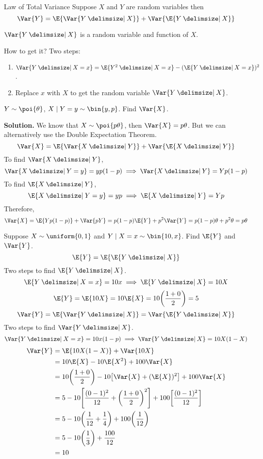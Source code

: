 \begin{Theorem}{Law of Total Variance}{}
    Suppose $ X $ and $ Y $ are random variables then
    \[ \Var{Y}=\E{\Var{Y\given X}}+\Var{\E{Y\given X}} \]
\end{Theorem}
\begin{Remark}{}{}
    $ \Var{Y\given X} $ is a random variable and function of $ X $.

    How to get it? Two steps:
    \begin{enumerate}
        \item $ \Var{Y\given X=x}=\E{Y^2\given X=x}-(\E{Y\given X=x})^2 $.
        \item Replace $ x $ with $ X $ to get
              the random variable $ \Var{Y\given X} $.
    \end{enumerate}
\end{Remark}
\begin{Example}{}{}
    $ Y \sim \poi{\theta} $, $ X\mid Y=y \sim \bin{y,p} $. Find
    $ \Var{X} $.

    \textbf{Solution.} We know that $ X \sim \poi{p\theta} $,
    then $ \Var{X}=p\theta $. But we can alternatively
    use the Double Expectation Theorem.
    \[ \Var{X}=\E{\Var{X\given Y}}+\Var{\E{X\given Y}} \]
    To find $ \Var{X\given Y} $,
    \[ \Var{X\given Y=y}=yp(1-p)\implies \Var{X\given Y}=Yp(1-p) \]
    To find $ \E{X\given Y} $,
    \[ \E{X\given Y=y}=yp\implies \E{X\given Y}=Yp \]
    Therefore,
    \[ \Var{X}=\E{Yp(1-p)}+\Var{pY}=p(1-p)\E{Y}+p^2\Var{Y}=
        p(1-p)\theta+p^2\theta=p\theta \]
\end{Example}
\begin{Example}{}{}
    Suppose $ X \sim \uniform{0,1} $ and
    $ Y\mid X=x \sim \bin{10,x} $. Find $ \E{Y} $
    and $ \Var{Y} $.
    \[ \E{Y}=\E{\E{Y\given X}} \]
    Two steps to find $ \E{Y\given X} $.
    \[ \E{Y\given X=x}=10x\implies \E{Y\given X}=10X \]
    \[ \E{Y}=\E{10X}=10\E{X}=10\biggl( \frac{1+0}{2} \biggr)=5 \]
    \[ \Var{Y}=\E{\Var{Y\given X}}=\Var{\E{Y\given X}} \]
    Two steps to find $ \Var{Y\given X} $.
    \[ \Var{Y\given X=x}=10x(1-p)\implies\Var{Y\given X}=10X(1-X) \]
    \begin{align*}
        \Var{Y}
         & =\E{10X(1-X)}+\Var{10X}                                                   \\
         & =10\E{X}-10\E{X^2}+100\Var{X}                                             \\
         & =10\biggl( \frac{1+0}{2} \biggr)-
        10\bigl[ \Var{X}+(\E{X})^2 \bigr]+100\Var{X}                                 \\
         & =5-10\Biggl[ \frac{(0-1)^2}{12}+\biggl( \frac{1+0}{2} \biggr)^2  \Biggr]+
        100\biggl[ \frac{(0-1)^2}{12} \biggr]                                        \\
         & =5-10\biggl( \frac{1}{12} +\frac{1}{4}  \biggr)+
        100\biggl( \frac{1}{12} \biggr)                                              \\
         & =5-10\biggl( \frac{1}{3} \biggr)+\frac{100}{12}                           \\
         & =10
    \end{align*}
\end{Example}
